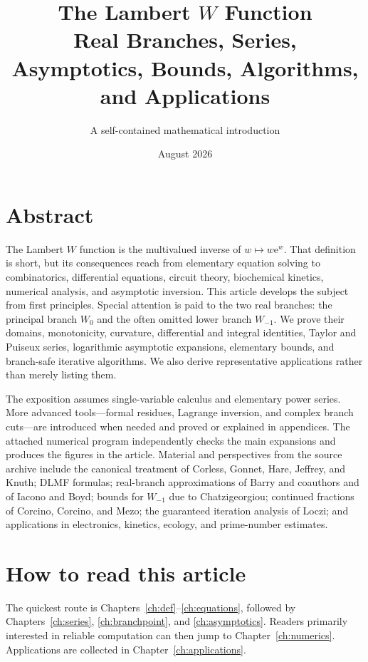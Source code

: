 \documentclass[11pt,oneside]{book}
\title{\Huge The Lambert $W$ Function\\[0.5em]
\Large Real Branches, Series, Asymptotics, Bounds, Algorithms, and Applications}
\author{A self-contained mathematical introduction}
\date{August 2026}
\theoremstyle{definition}
\theoremstyle{remark}
\newcommand{\ee}{\mathrm e}
\begin{document}
\frontmatter
\hypersetup{pageanchor=false}
\maketitle
\cleardoublepage
\hypersetup{pageanchor=true}
\setcounter{page}{1}

\chapter*{Abstract}
The Lambert $W$ function is the multivalued inverse of $w\mapsto w\ee^w$.
That definition is short, but its consequences reach from elementary equation
solving to combinatorics, differential equations, circuit theory, biochemical
kinetics, numerical analysis, and asymptotic inversion.  This article develops
the subject from first principles.  Special attention is paid to the two real
branches: the principal branch $W_0$ and the often omitted lower branch
$W_{-1}$.  We prove their domains, monotonicity, curvature, differential and
integral identities, Taylor and Puiseux series, logarithmic asymptotic
expansions, elementary bounds, and branch-safe iterative algorithms.  We also
derive representative applications rather than merely listing them.

The exposition assumes single-variable calculus and elementary power series.
More advanced tools---formal residues, Lagrange inversion, and complex branch
cuts---are introduced when needed and proved or explained in appendices.  The
attached numerical program independently checks the main expansions and
produces the figures in the article.  Material and perspectives from the
source archive include the canonical treatment of Corless, Gonnet, Hare,
Jeffrey, and Knuth; DLMF formulas; real-branch approximations of Barry and
coauthors and of Iacono and Boyd; bounds for $W_{-1}$ due to Chatzigeorgiou;
continued fractions of Corcino, Corcino, and Mezo; the guaranteed iteration
analysis of Loczi; and applications in electronics, kinetics, ecology, and
prime-number estimates.


\tableofcontents

\chapter*{How to read this article}
The quickest route is Chapters~\ref{ch:def}--\ref{ch:equations}, followed by
Chapters~\ref{ch:series}, \ref{ch:branchpoint}, and \ref{ch:asymptotics}.
Readers primarily interested in reliable computation can then jump to
Chapter~\ref{ch:numerics}.  Applications are collected in
Chapter~\ref{ch:applications}.
\end{document}
